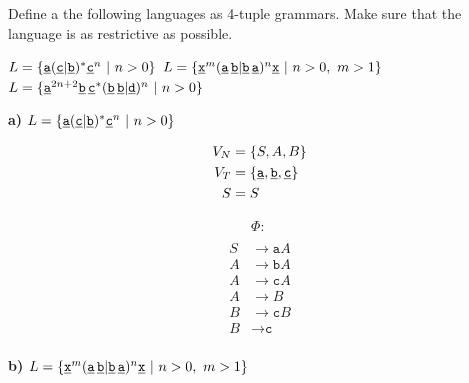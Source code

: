 \documentclass[10pt, a4paper]{article}
\begin{document}
\vspace{0.5cm}



Define a the following languages as 4-tuple grammars. Make sure that the language is as restrictive as possible.

\begin{abcliste}
    \abc $L = \{\underline{\texttt{a}}(\underline{\texttt{c}}|\underline{\texttt{b}})^{*} \underline{\texttt{c}}^{n} \ | \ n > 0\}$
    \abc $L = \{\underline{\texttt{x}}^{m}(\underline{\texttt{a}}\,\underline{\texttt{b}}|\underline{\texttt{b}}\,\underline{\texttt{a}})^{n}\underline{\texttt{x}} \ | \ n > 0,\ m > 1\}$
    \abc $L = \{\underline{\texttt{a}}^{2n+2} \underline{\texttt{b}} \, \underline{\texttt{c}}^{*}  (\underline{\texttt{b}}\,\underline{\texttt{b}}|\underline{\texttt{d}})^{n}  \ | \ n > 0\}$
\end{abcliste}

\vspace{0.5cm}

\newpage

\textbf{a)}  \hspace{5.5cm} $L = \{\underline{\texttt{a}}(\underline{\texttt{c}}|\underline{\texttt{b}})^{*} \underline{\texttt{c}}^{n} \ | \ n > 0\}$

\begin{align*}
V_N &= \{ S, A, B\} \\
V_T &= \{ \underline{\texttt{a}}, \underline{\texttt{b}}, \underline{\texttt{c}} \} \\
S  &= S
\end{align*}

\[
\begin{array}{rl}
& \Phi:     \\
& \\
S &\rightarrow \texttt{a}A \\
A &\rightarrow \texttt{b}A \\
A &\rightarrow \texttt{c}A \\
A &\rightarrow B \\
B &\rightarrow \texttt{c}B \\
B &\rightarrow \texttt{c} \\
\end{array}
\]

\vspace{2cm}


\textbf{b)}     \hspace{5.5cm} $L = \{\underline{\texttt{x}}^{m}(\underline{\texttt{a}}\,\underline{\texttt{b}}|\underline{\texttt{b}}\,\underline{\texttt{a}})^{n}\underline{\texttt{x}} \ | \ n > 0,\ m > 1\}$
\end{document}

